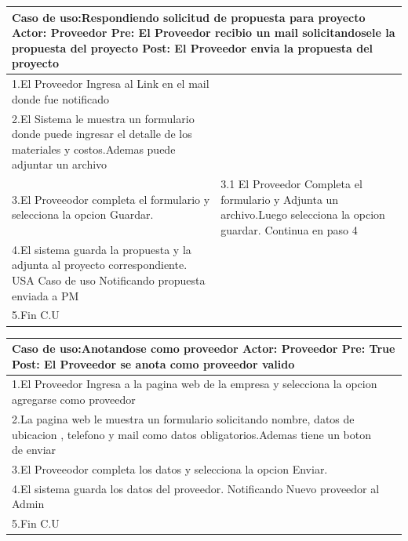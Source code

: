 \begin{longtable}{|p{}|p{}|}
    \hline
    \multicolumn{2}{|p{16cm}|}{
        \textbf{Caso de uso:}Respondiendo solicitud de propuesta para proyecto\newline
        \textbf{Actor:} Proveedor\newline
        \textbf{Pre: }El Proveedor recibio un mail solicitandosele la propuesta del proyecto\newline
        \textbf{Post:}  El Proveedor envia la propuesta del proyecto
    }\\
    \hline
    1.El Proveedor Ingresa al Link en el mail donde fue notificado&    \\
    \hline
    2.El Sistema le muestra un formulario donde puede ingresar el detalle de los materiales y costos.Ademas puede adjuntar un archivo& \\
    \hline
    3.El Proveeodor completa el formulario y selecciona la opcion Guardar. &3.1 El Proveedor Completa el formulario y Adjunta un archivo.Luego selecciona la opcion guardar. Continua en paso 4\\
    \hline
    4.El sistema guarda la propuesta y la adjunta al proyecto correspondiente. USA Caso de uso Notificando propuesta enviada a PM&\\
    \hline
    5.Fin C.U&\\
    \hline
\end{longtable}

\begin{longtable}{|p{}|p{}|}
    \hline
    \multicolumn{2}{|p{16cm}|}{
        \textbf{Caso de uso:}Anotandose como proveedor\newline
        \textbf{Actor:} Proveedor\newline
        \textbf{Pre: }True\newline
        \textbf{Post:}  El Proveedor se anota como proveedor valido
    }\\
    \hline
    1.El Proveedor Ingresa a la pagina web de la empresa y selecciona la opcion agregarse como proveedor&    \\
    \hline
    2.La pagina web le muestra un formulario solicitando nombre, datos de ubicacion , telefono y mail como datos obligatorios.Ademas tiene un boton de enviar& \\
    \hline
    3.El Proveeodor completa los datos y selecciona la opcion Enviar. &\\
    \hline
    4.El sistema guarda los datos del proveedor. Notificando Nuevo proveedor al Admin&\\
    \hline
    5.Fin C.U&\\
    \hline
\end{longtable}

